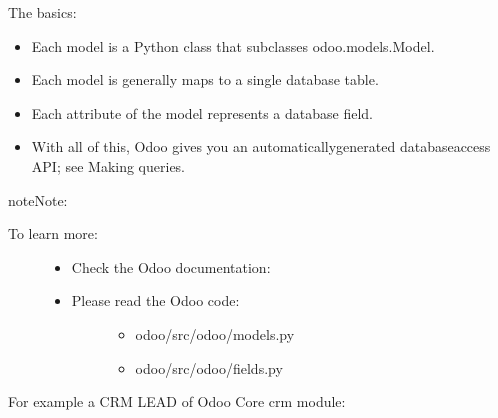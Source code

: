 \documentclass[letterpaper,10pt,english]{sphinxmanual}
\begin{document}
The basics:
\begin{itemize}
\item {} 
Each model is a Python class that subclasses odoo.models.Model.

\item {} 
Each model is generally maps to a single database table.

\item {} 
Each attribute of the model represents a database field.

\item {} 
With all of this, Odoo gives you an automatically\sphinxhyphen{}generated database\sphinxhyphen{}access API; see Making queries.

\end{itemize}

\begin{sphinxadmonition}{note}{Note:}\begin{description}
\item[{To learn more:}] \leavevmode\begin{itemize}
\item {} 
Check the Odoo documentation: 

\item {} \begin{description}
\item[{Please read the Odoo code:}] \leavevmode\begin{itemize}
\item {} 
odoo/src/odoo/models.py

\item {} 
odoo/src/odoo/fields.py

\end{itemize}

\end{description}

\end{itemize}

\end{description}
\end{sphinxadmonition}

For example a CRM LEAD of Odoo Core crm module:
\end{document}
